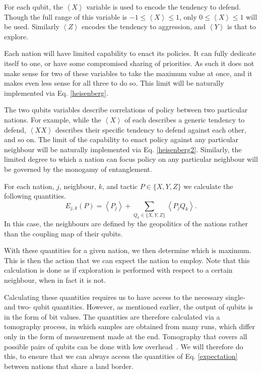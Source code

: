 \documentclass[conference]{IEEEtran}
\begin{document}
For each qubit, the $\left\langle X\right\rangle$ variable is used to encode the tendency to defend. Though the full range of this variable is $-1 \leq \left\langle X\right\rangle \leq 1$, only $0 \leq \left\langle X\right\rangle \leq 1$ will be used. Similarly $\left\langle Z\right\rangle$ encodes the tendency to aggression, and $\left\langle Y\right\rangle$ is that to explore.

Each nation will have limited capability to enact its policies. It can fully dedicate itself to one, or have some compromised sharing of priorities. As such it does not make sense for two of these variables to take the maximum value at once, and it makes even less sense for all three to do so. This limit will be naturally implemented via Eq. \ref{heisenberg}.

The two qubits variables describe correlations of policy between two particular nations. For example, while the $\left\langle X\right\rangle$ of each describes a generic tendency to defend, $\left\langle XX\right\rangle$ describes their specific tendency to defend against each other, and so on. The limit of the capability to enact policy against any particular neighbour will be naturally implemented via  Eq. \ref{heisenberg2}. Similarly, the limited degree to which a nation can focus policy on any particular neighbour will be governed by the monogamy of entanglement.

For each nation, $j$, neighbour, $k$, and tactic $P  \in \{X,Y,Z\}$ we calculate the following quantities.
\begin{equation} \label{expectation}
E_{j,k} (P) = \left\langle P_j \right\rangle + \sum_{Q_k \in \{X,Y,Z\} } \left\langle P_j Q_k\right\rangle.
\end{equation}
In this case, the neighbours are defined by the geopolitics of the nations rather than the coupling map of their qubits.

With these quantities for a given nation, we then determine which is maximum. This is then the action that we can expect the nation to employ. Note that this calculation is done as if exploration is performed with respect to a certain neighbour, when in fact it is not.

Calculating these quantities requires us to have access to the necessary single- and two- qubit quantities. However, as mentioned earlier, the output of qubits is in the form of bit values. The quantities are therefore calculated via a tomography process, in which samples are obtained from many runs, which differ only in the form of measurement made at the end. Tomography that covers all possible pairs of qubits can be done with low overhead~\cite{garciaperez:19}. We will therefore do this, to ensure that we can always access the quantities of Eq. \ref{expectation} between nations that share a land border.
\end{document}
